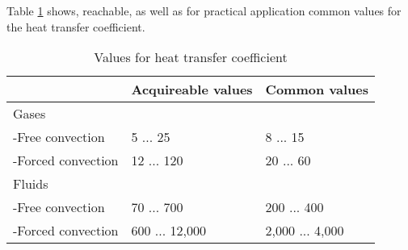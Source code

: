 Table \ref{fig:htc_values} shows, reachable, as well as for practical application common values for the heat transfer coefficient.
\begin{table}[h]
\centering
\caption{Values for heat transfer coefficient}
\label{fig:htc_values}
\begin{tabular}{lll}
&Acquireable values&Common values\\
\hline
Gases&&\\
-Free convection&5 ... 25&8 ... 15\\
-Forced convection&12 ... 120&20 ... 60\\
Fluids&&\\
-Free convection&70 ... 700&200 ... 400\\
-Forced convection&600 ... 12,000&2,000 ... 4,000\\
\end{tabular}
\end{table}







